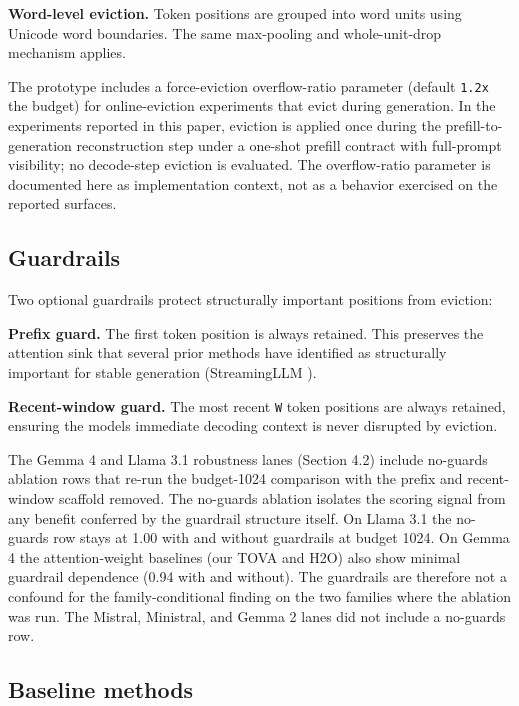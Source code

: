 \documentclass[10pt]{article}
\begin{document}
\textbf{Word-level eviction.} Token positions are grouped into word
units using Unicode word boundaries. The same max-pooling and
whole-unit-drop mechanism applies.

The prototype includes a force-eviction overflow-ratio parameter
(default \texttt{1.2x} the budget) for online-eviction experiments that
evict during generation. In the experiments reported in this paper,
eviction is applied once during the prefill-to-generation reconstruction
step under a one-shot prefill contract with full-prompt visibility; no
decode-step eviction is evaluated. The overflow-ratio parameter is
documented here as implementation context, not as a behavior exercised
on the reported surfaces.

\subsection{Guardrails}\label{33-guardrails}

Two optional guardrails protect structurally important positions from
eviction:

\textbf{Prefix guard.} The first token position is always retained. This
preserves the attention sink that several prior methods have identified
as structurally important for stable generation (StreamingLLM \citep{xiao2023streamingllm}).

\textbf{Recent-window guard.} The most recent \texttt{W} token positions
are always retained, ensuring the model\textquotesingle s immediate
decoding context is never disrupted by eviction.

The Gemma 4 and Llama 3.1 robustness lanes (Section 4.2) include
no-guards ablation rows that re-run the budget-1024 comparison with the
prefix and recent-window scaffold removed. The no-guards ablation
isolates the scoring signal from any benefit conferred by the guardrail
structure itself. On Llama 3.1 the no-guards row stays at 1.00 with and
without guardrails at budget 1024. On Gemma 4 the attention-weight
baselines (our TOVA and H2O) also show minimal guardrail
dependence (0.94 with and without). The guardrails are therefore not a
confound for the family-conditional finding on the two families where
the ablation was run. The Mistral, Ministral, and Gemma 2 lanes did not
include a no-guards row.

\subsection{Baseline methods}\label{34-baseline-methods}
\end{document}
